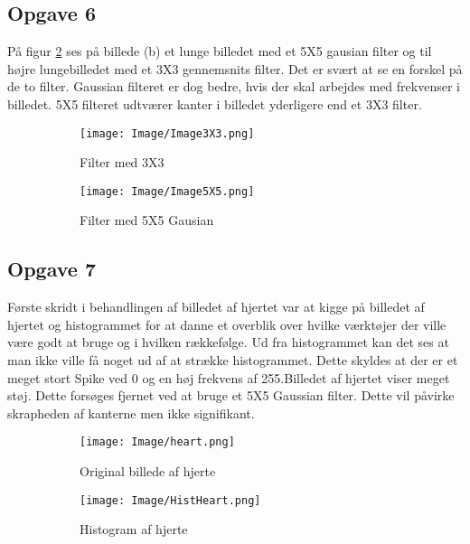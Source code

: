 \documentclass{article}
\begin{document}
\subsection{Opgave 6} 

På figur \ref{fig:image3} ses på billede (b) et lunge billedet med et 5X5 gausian filter og til højre lungebilledet med et 3X3 gennemsnits filter. Det er svært at se en forskel på de to filter. Gaussian filteret er dog bedre, hvis der skal arbejdes med frekvenser i billedet. 5X5 filteret udtværer kanter i billedet yderligere end et 3X3 filter. 

\begin{figure}[H] 
  \begin{subfigure}[b]{0.49\textwidth} 
    \texttt{[image: Image/Image3X3.png]} 
    \caption{Filter med 3X3} 
  \end{subfigure} 
  \hfill 
  \begin{subfigure}[b]{0.49\textwidth} 
    \texttt{[image: Image/Image5X5.png]} 
    \caption{Filter med 5X5 Gausian} 
    \label{fig:f6} 
  \end{subfigure} 
      \caption{} 
    \label{fig:image3} 
\end{figure} 

  
\subsection{Opgave 7} 

Første skridt i behandlingen af billedet af hjertet var at kigge på billedet af hjertet og histogrammet for at danne et overblik over hvilke værktøjer der ville være godt at bruge og i hvilken rækkefølge.\newline 
Ud fra histogrammet kan det ses at man ikke ville få noget ud af at strække histogrammet. Dette skyldes at der er et meget stort Spike ved 0 og en høj frekvens af 255.\newline Billedet af hjertet viser meget støj. Dette forsøges fjernet ved at bruge et 5X5 Gaussian filter. Dette vil påvirke skrapheden af kanterne men ikke signifikant. 

\begin{figure}[H] 
    \begin{subfigure}[b]{0.49\textwidth} 
        \texttt{[image: Image/heart.png]} 
        \caption{Original billede af hjerte} 
        \label{fig:f7} 
    \end{subfigure} 
    \hfill 
    \begin{subfigure}[b]{0.49\textwidth} 
        \texttt{[image: Image/HistHeart.png]} 
        \caption{Histogram af hjerte} 
        \label{fig:f8} 
    \end{subfigure} 
    \caption{} 
    \label{fig:image4} 
\end{figure} 
\end{document}
